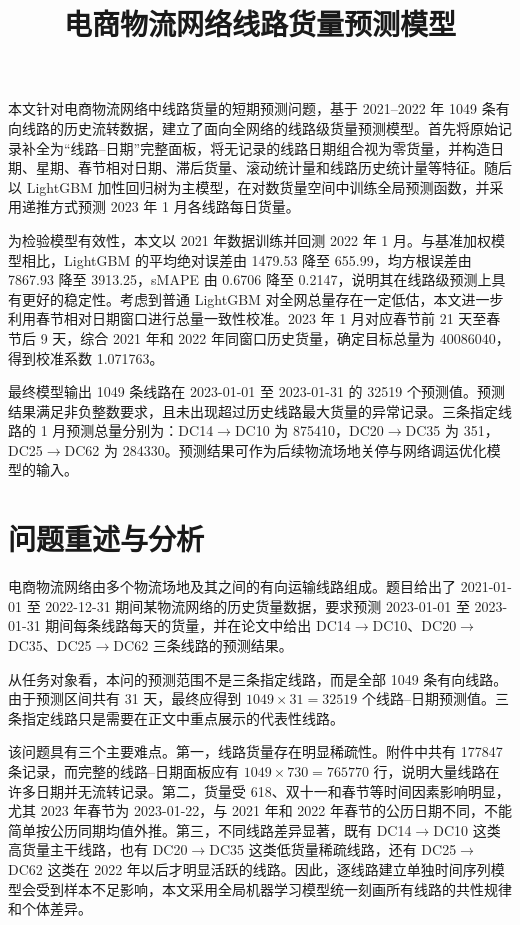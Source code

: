 \documentclass[UTF8,zihao=-4,a4paper,fontset=fandol]{ctexart}
\title{电商物流网络线路货量预测模型}
\author{}
\date{}
\begin{document}
\maketitle

\begin{cumcmabstract}
本文针对电商物流网络中线路货量的短期预测问题，基于 2021--2022 年 1049 条有向线路的历史流转数据，建立了面向全网络的线路级货量预测模型。首先将原始记录补全为“线路--日期”完整面板，将无记录的线路日期组合视为零货量，并构造日期、星期、春节相对日期、滞后货量、滚动统计量和线路历史统计量等特征。随后以 LightGBM 加性回归树为主模型，在对数货量空间中训练全局预测函数，并采用递推方式预测 2023 年 1 月各线路每日货量。

为检验模型有效性，本文以 2021 年数据训练并回测 2022 年 1 月。与基准加权模型相比，LightGBM 的平均绝对误差由 1479.53 降至 655.99，均方根误差由 7867.93 降至 3913.25，sMAPE 由 0.6706 降至 0.2147，说明其在线路级预测上具有更好的稳定性。考虑到普通 LightGBM 对全网总量存在一定低估，本文进一步利用春节相对日期窗口进行总量一致性校准。2023 年 1 月对应春节前 21 天至春节后 9 天，综合 2021 年和 2022 年同窗口历史货量，确定目标总量为 40086040，得到校准系数 1.071763。

最终模型输出 1049 条线路在 2023-01-01 至 2023-01-31 的 32519 个预测值。预测结果满足非负整数要求，且未出现超过历史线路最大货量的异常记录。三条指定线路的 1 月预测总量分别为：DC14$\rightarrow$DC10 为 875410，DC20$\rightarrow$DC35 为 351，DC25$\rightarrow$DC62 为 284330。预测结果可作为后续物流场地关停与网络调运优化模型的输入。
\end{cumcmabstract}


\CumcmBodyStart

\section{问题重述与分析}

电商物流网络由多个物流场地及其之间的有向运输线路组成。题目给出了 2021-01-01 至 2022-12-31 期间某物流网络的历史货量数据，要求预测 2023-01-01 至 2023-01-31 期间每条线路每天的货量，并在论文中给出 DC14$\rightarrow$DC10、DC20$\rightarrow$DC35、DC25$\rightarrow$DC62 三条线路的预测结果。

从任务对象看，本问的预测范围不是三条指定线路，而是全部 1049 条有向线路。由于预测区间共有 31 天，最终应得到 $1049\times31=32519$ 个线路--日期预测值。三条指定线路只是需要在正文中重点展示的代表性线路。

该问题具有三个主要难点。第一，线路货量存在明显稀疏性。附件中共有 177847 条记录，而完整的线路--日期面板应有 $1049\times730=765770$ 行，说明大量线路在许多日期并无流转记录。第二，货量受 618、双十一和春节等时间因素影响明显，尤其 2023 年春节为 2023-01-22，与 2021 年和 2022 年春节的公历日期不同，不能简单按公历同期均值外推。第三，不同线路差异显著，既有 DC14$\rightarrow$DC10 这类高货量主干线路，也有 DC20$\rightarrow$DC35 这类低货量稀疏线路，还有 DC25$\rightarrow$DC62 这类在 2022 年以后才明显活跃的线路。因此，逐线路建立单独时间序列模型会受到样本不足影响，本文采用全局机器学习模型统一刻画所有线路的共性规律和个体差异。
\end{document}
